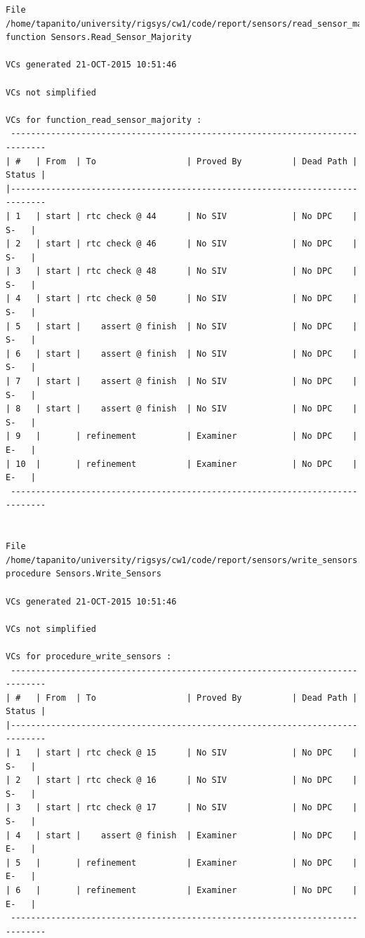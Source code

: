 \documentclass[a4paper, titlepage]{article}
\begin{document}
{\begin{lstlisting}
File /home/tapanito/university/rigsys/cw1/code/report/sensors/read_sensor_majority.vcg
function Sensors.Read_Sensor_Majority

VCs generated 21-OCT-2015 10:51:46

VCs not simplified

VCs for function_read_sensor_majority :
 -----------------------------------------------------------------------------
| #   | From  | To                  | Proved By          | Dead Path | Status |
|-----------------------------------------------------------------------------
| 1   | start | rtc check @ 44      | No SIV             | No DPC    |   S-   |
| 2   | start | rtc check @ 46      | No SIV             | No DPC    |   S-   |
| 3   | start | rtc check @ 48      | No SIV             | No DPC    |   S-   |
| 4   | start | rtc check @ 50      | No SIV             | No DPC    |   S-   |
| 5   | start |    assert @ finish  | No SIV             | No DPC    |   S-   |
| 6   | start |    assert @ finish  | No SIV             | No DPC    |   S-   |
| 7   | start |    assert @ finish  | No SIV             | No DPC    |   S-   |
| 8   | start |    assert @ finish  | No SIV             | No DPC    |   S-   |
| 9   |       | refinement          | Examiner           | No DPC    |   E-   |
| 10  |       | refinement          | Examiner           | No DPC    |   E-   |
 -----------------------------------------------------------------------------


File /home/tapanito/university/rigsys/cw1/code/report/sensors/write_sensors.vcg
procedure Sensors.Write_Sensors

VCs generated 21-OCT-2015 10:51:46

VCs not simplified

VCs for procedure_write_sensors :
 -----------------------------------------------------------------------------
| #   | From  | To                  | Proved By          | Dead Path | Status |
|-----------------------------------------------------------------------------
| 1   | start | rtc check @ 15      | No SIV             | No DPC    |   S-   |
| 2   | start | rtc check @ 16      | No SIV             | No DPC    |   S-   |
| 3   | start | rtc check @ 17      | No SIV             | No DPC    |   S-   |
| 4   | start |    assert @ finish  | Examiner           | No DPC    |   E-   |
| 5   |       | refinement          | Examiner           | No DPC    |   E-   |
| 6   |       | refinement          | Examiner           | No DPC    |   E-   |
 -----------------------------------------------------------------------------



\end{lstlisting}}
\end{document}
